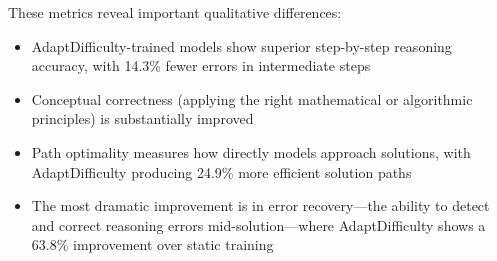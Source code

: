 These metrics reveal important qualitative differences:

\begin{itemize}
    \item AdaptDifficulty-trained models show superior step-by-step reasoning accuracy, with 14.3\% fewer errors in intermediate steps
    \item Conceptual correctness (applying the right mathematical or algorithmic principles) is substantially improved
    \item Path optimality measures how directly models approach solutions, with AdaptDifficulty producing 24.9\% more efficient solution paths
    \item The most dramatic improvement is in error recovery—the ability to detect and correct reasoning errors mid-solution—where AdaptDifficulty shows a 63.8\% improvement over static training
\end{itemize}

